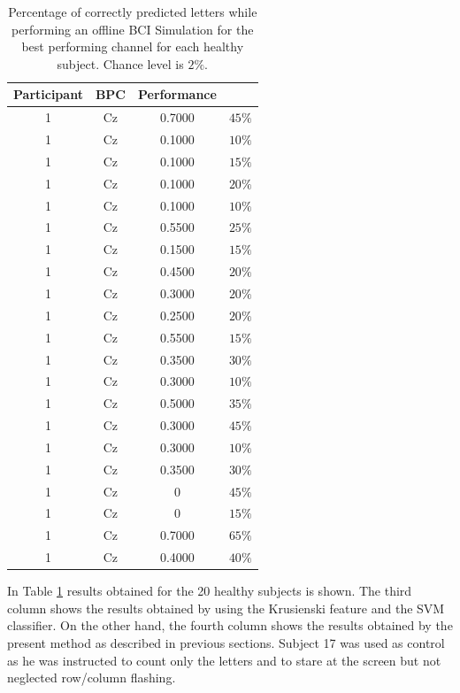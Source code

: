\documentclass[entropy,article,submit,moreauthors,pdftex,10pt,a4paper]{mdpi}
\begin{document}
\begin{table}[H]
\caption{Percentage of correctly predicted letters while performing an offline BCI Simulation for the best performing channel for each healthy subject. Chance level is $2\%$. }
\centering
\begin{tabular}{cccc}
\toprule
\textbf{Participant}	&  \textbf{BPC}	& \textbf{Performance}\\
\midrule
1     &     Cz   &     0.7000  &  $45\%$  \\
1     &     Cz   &    0.1000   &  $10\%$ \\
1     &     Cz   &     0.1000  &  $15\%$ \\
1     &     Cz   &     0.1000  &  $20\%$  \\
1     &     Cz   &     0.1000  &  $10\%$ \\
1     &     Cz   &     0.5500  &  $25\%$ \\
1     &     Cz   &     0.1500  &  $15\%$ \\
1     &     Cz   &     0.4500  &  $20\%$ \\
1     &     Cz   &     0.3000  &  $20\%$ \\
1     &     Cz   &     0.2500  &  $20\%$ \\
1     &     Cz   &     0.5500  &  $15\%$ \\
1     &     Cz   &     0.3500  &  $30\%$ \\
1     &     Cz   &     0.3000  &  $10\%$ \\
1     &     Cz   &     0.5000  &  $35\%$ \\
1     &     Cz   &     0.3000  &  $45\%$ \\
1     &     Cz   &     0.3000  &  $10\%$ \\
1     &     Cz   &     0.3500  &  $30\%$ \\
1     &     Cz   &          0      &  $45\%$ \\
1     &     Cz   &          0      &  $15\%$ \\
1     &     Cz   &     0.7000  &  $65\%$ \\
1     &     Cz   &     0.4000  &  $40\%$ \\

\bottomrule
\end{tabular}
\label{tab:resultsowndataset}
\end{table}

In Table \ref{tab:resultsowndataset} results obtained for the 20 healthy subjects is shown.  The third column shows the results obtained by using the Krusienski feature and the SVM classifier.  On the other hand, the fourth column shows the results obtained by the present method as described in previous sections.  Subject 17 was used as control as he was instructed to count only the letters and to stare at the screen but not neglected row/column flashing.
\end{document}
